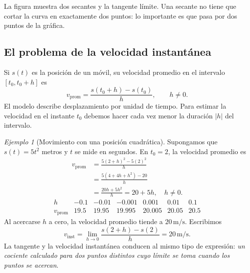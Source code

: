\documentclass[12pt]{article}
\theoremstyle{remark}
\newtheorem{ejemplo}{Ejemplo}
\begin{document}
\begin{center}
\end{center}
La figura muestra dos secantes y la tangente límite. Una secante no tiene que cortar la curva en exactamente dos puntos: lo importante es que pasa por dos puntos de la gráfica.

\subsection*{El problema de la velocidad instantánea}
Si $s(t)$ es la posición de un móvil, su velocidad promedio en el intervalo $[t_0,t_0+h]$ es
\[
 v_{\mathrm{prom}}=\frac{s(t_0+h)-s(t_0)}{h},\qquad h\ne0.
\]
El modelo describe desplazamiento por unidad de tiempo. Para estimar la velocidad en el instante $t_0$ debemos hacer cada vez menor la duración $|h|$ del intervalo.

\begin{ejemplo}[Movimiento con una posición cuadrática]
Supongamos que $s(t)=5t^2$ metros y $t$ se mide en segundos. En $t_0=2$, la velocidad promedio es
\begin{align*}
 v_{\mathrm{prom}}&=\frac{5(2+h)^2-5(2)^2}{h}\\
 &=\frac{5(4+4h+h^2)-20}{h}\\
 &=\frac{20h+5h^2}{h}=20+5h,\quad h\ne0.
\end{align*}
\[
\begin{array}{c|rrrrrr}
 h&-0.1&-0.01&-0.001&0.001&0.01&0.1\\\hline
 v_{\mathrm{prom}}&19.5&19.95&19.995&20.005&20.05&20.5
\end{array}
\]
Al acercarse $h$ a cero, la velocidad promedio tiende a $20\,\mathrm{m/s}$. Escribimos
\[
\boxed{v_{\mathrm{inst}}=\lim_{h\to0}\frac{s(2+h)-s(2)}{h}=20\,\mathrm{m/s}.}
\]
La tangente y la velocidad instantánea conducen al mismo tipo de expresión: \emph{un cociente calculado para dos puntos distintos cuyo límite se toma cuando los puntos se acercan}.
\end{ejemplo}
\end{document}
